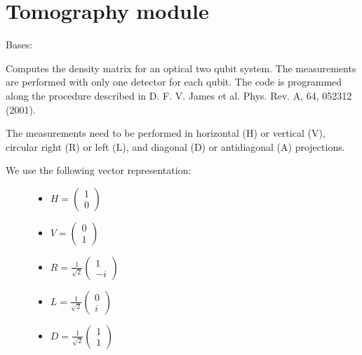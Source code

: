 \documentclass[letterpaper,10pt,english]{sphinxmanual}
\begin{document}
\section{Tomography module}
\label{modules:tomography-module}\label{modules:module-Tomography}

\begin{fulllineitems}
\label{modules:Tomography.DensityMatrix}
Bases: 

Computes the density matrix for an optical two qubit system.
The measurements are performed with only one detector for each qubit.
The code is programmed along the procedure described in D. F. V. James et al. Phys. Rev. A, 64, 052312 (2001).

The measurements need to be performed in horizontal (H) or vertical (V),
circular right (R) or left (L), and diagonal (D) or antidiagonal (A) projections.
\begin{description}
\item[{We use the following vector representation:}] \leavevmode\begin{itemize}
\item {} 
\(H=\begin{pmatrix}1 \\ 0 \end{pmatrix}\)

\item {} 
\(V=\begin{pmatrix}0 \\ 1 \end{pmatrix}\)

\item {} 
\(R=\frac{1}{\sqrt{2}}\begin{pmatrix}1 \\ -i \end{pmatrix}\)

\item {} 
\(L=\frac{1}{\sqrt{2}}\begin{pmatrix}0 \\ i \end{pmatrix}\)

\item {} 
\(D=\frac{1}{\sqrt{2}}\begin{pmatrix}1 \\ 1 \end{pmatrix}\)


\end{itemize}
\end{description}
\end{fulllineitems}
\end{document}
